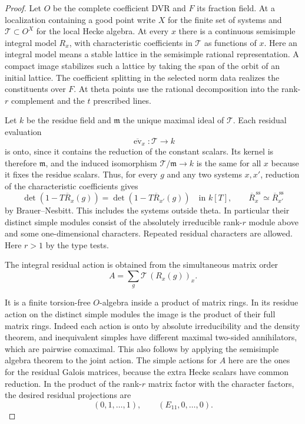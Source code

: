 \begin{proof}
Let \(O\) be the complete coefficient DVR and \(F\) its fraction
field. At a localization containing a good point write \(X\)
for the finite set of systems and \(\mathcal T\subset O^X\)
for the local Hecke algebra. At every \(x\) there is a
continuous semisimple integral model \(R_x\), with characteristic
coefficients in \(\mathcal T\) as functions of \(x\).
Here an integral model means a stable lattice in the semisimple
rational representation. A compact image stabilizes such a lattice
by taking the span of the orbit of an initial lattice. The
coefficient splitting in the selected norm data realizes the
constituents over \(F\). At theta points use the rational
decomposition into the rank-\(r\) complement and the \(t\)
prescribed lines.

Let \(k\) be the residue field and \(\mathfrak m\) the unique maximal
ideal of \(\mathcal T\). Each residual evaluation
\[
 \overline{\operatorname{ev}}_x:\mathcal T\longrightarrow k
\]
is onto, since it contains the reduction of the constant scalars. Its kernel is therefore
\(\mathfrak m\), and the induced isomorphism \(\mathcal T/\mathfrak m\to k\)
is the same for all \(x\) because it fixes the residue scalars. Thus,
for every \(g\) and any two systems \(x,x'\), reduction of the
characteristic coefficients gives
\[
 \det(1-T\overline R_x(g))=\det(1-T\overline R_{x'}(g))
       \quad\text{in }k[T],
 \qquad
 \overline R_x^{\,\mathrm{ss}}\simeq \overline R_{x'}^{\,\mathrm{ss}}
\]
by Brauer--Nesbitt. This includes the systems outside theta.
In particular their distinct simple modules consist of the
absolutely irreducible rank-\(r\) module above and some
one-dimensional characters. Repeated residual characters are
allowed. Here \(r>1\) by the type tests.

The integral residual action is obtained from the simultaneous matrix order
\[
 A=\sum_g\mathcal T\,(R_x(g))_x.
\]

It is a finite torsion-free \(O\)-algebra inside a product of
matrix rings. In its residue action on the distinct simple
modules the image is the product of their full matrix rings.
Indeed each action is onto by absolute irreducibility and the
density theorem, and inequivalent simples have different
maximal two-sided annihilators, which are pairwise comaximal.
This also follows by applying the semisimple algebra theorem
to the joint action. The simple actions for \(A\) here are the
ones for the residual Galois matrices, because the extra Hecke
scalars have common reduction. In the product of the rank-\(r\) matrix factor with the character factors, the desired residual projections are
\[
 (0,1,\ldots,1),\qquad (E_{11},0,\ldots,0).
\]



\end{proof}
